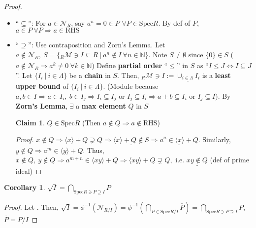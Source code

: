 \documentclass[12pt,a4paper]{article}
\theoremstyle{definition}
\newtheorem{corollary}{Corollary}
\newtheorem{claim}{Claim}
\begin{document}
\noindent\textit{Proof.}
\begin{itemize}
  \item ``$\subseteq$'': For $a \in \mathcal{N}_R$, say \underline{$a^n = 0 \in P$} $\forall P \in \text{Spec}R$. By def of $P$, $a \in P\ \forall P \Rightarrow a \in \text{RHS}$
  \item ``$\supseteq$'': Use contraposition and Zorn's Lemma. Let $a \notin \mathcal{N}_R,\ S = \{\text{}_R\mathcal{M} \ni I \subseteq R\ |\ \underline{a^n \notin I}\ \forall n \in \mathbb{N}\}$. Note \underline{$S \neq \emptyset$} since \underline{$\{0\} \in S$} ($a \notin \mathcal{N}_R \Rightarrow a^k \neq 0\ \forall k \in \mathbb{N}$)\newline\newline
  \noindent Define \textbf{partial order} ``$\leq$'' in $S$ as ``$I \leq J \Leftrightarrow I \subseteq J$''. Let \underline{$\{I_i\ |\ i \in \Lambda\}$} be a \textbf{chain} in $S$. Then, $\text{}_R\mathcal{M} \ni I := \underline{\cup_{i \in \Lambda} I_i}$ is a \textbf{least upper bound} of $\{I_i\ |\ i \in \Lambda\}$. (Module because $a, b \in I \Rightarrow a \in I_i,\ b \in I_j \Rightarrow I_i \subseteq I_j \text{ or } I_j \subseteq I_i \Rightarrow a + b \subseteq I_i \text{ or } I_j \subseteq I$). By \textbf{Zorn's Lemma}, $\exists$ a \textbf{max element} $Q$ in $S$
  
  \begin{claim}
    $\boxed{Q \in \text{Spec}R}$ (Then $a \notin Q \Rightarrow a \notin \text{RHS}$)
  \end{claim}
  \vspace{-1.3em}\begin{proof}
    $x \notin Q \Rightarrow \langle x \rangle + Q \supsetneq Q \Rightarrow \underline{\langle x \rangle + Q \notin S} \Rightarrow \underline{a^n \in \langle x \rangle + Q}$. Similarly, $y \notin Q \Rightarrow a^m \in \langle y \rangle + Q$. Thus, $x \notin Q,\ y \notin Q \Rightarrow a^{m + n} \in \langle xy \rangle + Q \Rightarrow \langle xy \rangle + Q \supsetneq Q, \text{ i.e. } \underline{xy \notin Q}$ (def of prime ideal)
  \end{proof}
\end{itemize}

\begin{corollary}
  $\sqrt{I} = \bigcap_{\text{Spec}R \ni P \supseteq I} P$
\end{corollary}

\begin{proof}
  Let . Then, $\sqrt{I} = \phi^{-1}(\mathcal{N}_{R/I}) = \phi^{-1}(\bigcap_{\overline{P} \in \text{Spec}R/I} \overline{P}) = \bigcap_{\text{Spec}R \ni P \supseteq I} P$, $\overline{P} = P/I$
\end{proof}
\vspace{0.125em}
\end{document}
